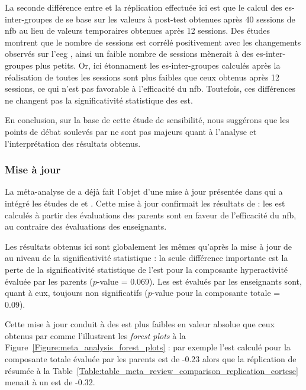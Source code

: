 La seconde différence entre \citep{Cortese2016} et la réplication effectuée ici est que le calcul des \gls{es}-inter-groupes de \citet{Arnold2014} se base 
sur les valeurs à post-test obtenues après 40 sessions de \gls{nfb} au lieu de valeurs temporaires obtenues après 12 sessions. Des études montrent
que le nombre de sessions est corrélé positivement avec les changements observés sur l'\gls{eeg} \citep{Vernon2004}, ainsi un faible nombre de sessions mènerait
à des \gls{es}-inter-groupes plus petits. Or, ici étonnament les \gls{es}-inter-groupes calculés après la réalisation de toutes les sessions sont plus faibles que ceux 
obtenus après 12 sessions, ce qui n'est pas favorable à l'efficacité du \gls{nfb}. Toutefois, ces différences ne changent pas la significativité statistique des \gls{est}. 

En conclusion, sur la base de cette étude de sensibilité, nous suggérons que les points de débat soulevés par \citet{Micoulaud2016} ne sont pas majeurs 
quant à l'analyse et l'interprétation des résultats obtenus.

\subsubsection{Mise à jour} \label{meta_analysis_update}

La méta-analyse de \citep{Cortese2016} a déjà fait l'objet d'une mise à jour présentée dans \citet{Bussalb2019clinical} qui a intégré les études de 
\citep{Bazanova2018, Baumeister2016} et \citet{Strehl2017}. Cette mise à jour confirmait les résultats de \citep{Cortese2016} : les \gls{est} calculés 
à partir des évaluations des parents sont en faveur de l'efficacité du \gls{nfb}, au contraire des évaluations des enseignants. 

Les résultats obtenus ici sont globalement les mêmes qu'après la mise à jour de \citet{Bussalb2019clinical} au niveau de la significativité statistique : la seule
différence importante est la perte de la significativité statistique de l'\gls{est} pour la composante hyperactivité évaluée par les parents ($p$-value = 0.069).
Les \gls{est} évalués par les enseignants sont, quant à eux, toujours non significatifs ($p$-value pour la composante totale =  0.09). 

Cette mise à jour conduit à des \gls{est} plus faibles en valeur absolue que ceux obtenus par \citet{Cortese2016} comme l'illustrent les \textit{forest plots} à 
la Figure~\ref{Figure:meta_analysis_forest_plots} : par exemple l'\gls{est} calculé pour la composante totale évaluée par les parents est de -0.23 alors
que la réplication de \citet{Cortese2016} résumée à la Table~\ref{Table:table_meta_review_comparison_replication_cortese} menait à un \gls{est} de -0.32.

